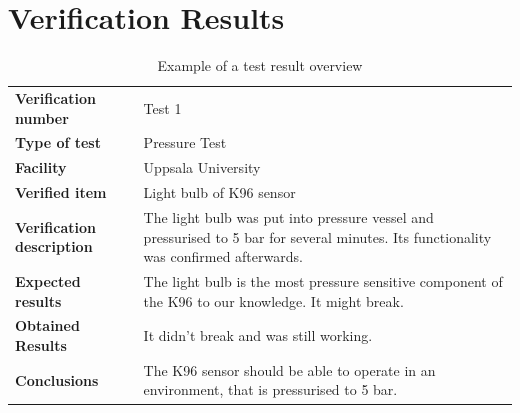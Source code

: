 \clearpage
\section{Verification Results}


\begin{table}[htbp]
\centering
\caption{Example of a test result overview}
\label{tab:test_result}
\begin{tabular}{L{5cm}L{10cm}}
\toprule
\textbf{Verification number} & Test 1\\
\textbf{Type of test} & Pressure Test\\
\textbf{Facility} & Uppsala University\\
\textbf{Verified item} & Light bulb of K96 sensor\\
\textbf{Verification description} & The light bulb was put into pressure vessel and pressurised to 5 bar for several minutes. Its functionality was confirmed afterwards.\\
\textbf{Expected results} & The light bulb is the most pressure sensitive component of the K96 to our knowledge. It might break.\\
\textbf{Obtained Results} & It didn't break and was still working. \\
\textbf{Conclusions} & The K96 sensor should be able to operate in an environment, that is pressurised to 5 bar.\\
\bottomrule
\end{tabular}
\end{table}


